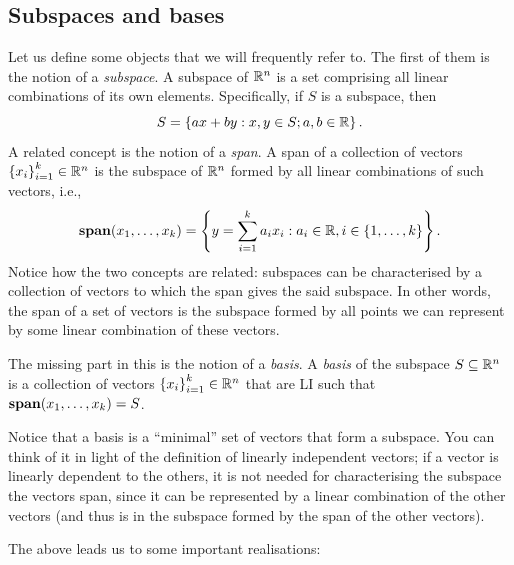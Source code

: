 \subsection{Subspaces and bases}

Let us define some objects that we will frequently refer to. The first of them is the notion of a \emph{subspace}. A subspace of $\mathbb{R}^n$ is a set comprising all linear combinations of its own elements. Specifically, if $S$ is a subspace, then
%
\begin{equation*}
	S = \left\{ ax + by : x,y \in S; a,b \in \mathbb{R} \right \}.
\end{equation*}
%
A related concept is the notion of a \emph{span}. A span of a collection of vectors $\left\{ x_i \right \}_{i=1}^k \in \mathbb{R}^n$ is the subspace of $\mathbb{R}^n$ formed by all linear combinations of such vectors, i.e., 
%
\begin{equation*}
	\mathop{\bf span}(x_1,\dots, x_k) = \left\{ y = \sum_{i=1}^k a_ix_i : a_i \in \mathbb{R}, i \in \left\{ 1,\dots, k \right \} \right \}. 
\end{equation*}
%
Notice how the two concepts are related: subspaces can be characterised by a collection of vectors to which the span gives the said subspace. In other words, the span of a set of vectors is the subspace formed by all points we can represent by some linear combination of these vectors. 

The missing part in this is the notion of a \emph{basis}. A \emph{basis} of the subspace $S \subseteq \mathbb{R}^n$ is a collection of vectors $\left\{ x_i \right \}_{i=1}^k \in \mathbb{R}^n$ that are LI such that $\mathop{\bf span}(x_1,\dots, x_k) = S$. 

Notice that a basis is a ``minimal'' set of vectors that form a subspace. You can think of it in light of the definition of linearly independent vectors; if a vector is linearly dependent to the others, it is not needed for characterising the subspace the vectors span, since it can be represented by a linear combination of the other vectors (and thus is in the subspace formed by the span of the other vectors).

The above leads us to some important realisations:

